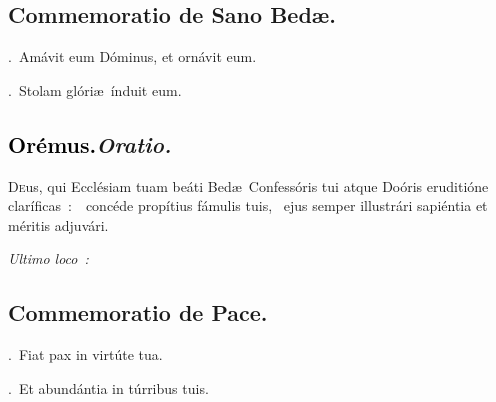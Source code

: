 \documentclass[12pt]{article} %
\newenvironment{rubric}{\vspace{2 mm}\color{benred8} \itshape \leftskip 0in \setlength{\parindent}{0.25in}}{\vspace{2 mm}}
\newenvironment{response}{\leftskip 0in \setlength{\parindent}{0in}}{\vspace{2 mm}}
\let\oldgresixstar\gresixstar
\renewcommand{\gresixstar}{\textcolor{benred8}{\oldgresixstar}}
\let\oldgredagger\gredagger
\renewcommand{\gredagger}{\textcolor{benred8}{\oldgredagger}}
\let\oldVbar\Vbar
\renewcommand{\Vbar}{\textcolor{benred8}{\oldVbar .}}
\let\oldRbar\Rbar
\renewcommand{\Rbar}{\textcolor{benred8}{\oldRbar .}}
\def\capitulumSpace{\hspace{20 mm}}
\begin{document}
\subsection*{Commemoratio de Sano Bed\ae .}

\gresetfirstlineaboveinitial{\small \textsc{ \textbf{\textcolor{benred8}{IV}}}}{\small \textsc{ \textbf{\textcolor{benred8}{IV}}}}


\begin{response}
\Vbar\ Am\'{a}vit eum D\'{o}minus, et orn\'{a}vit eum.

\Rbar\ Stolam gl\'{o}ri\ae\ \'{i}nduit eum.

\end{response}

\subsection*{\textcolor{black}{Or\'{e}mus.}\capitulumSpace \emph{Oratio.}}

\begin{response}\lettrine{D}{e}us, qui Eccl\'{e}siam tuam be\'{a}ti Bed\ae\ Confess\'{o}ris tui atque Do\'{o}ris eruditi\'{o}ne clar\'{i}ficas~:~\gredagger\ conc\'{e}de prop\'{i}tius f\'{a}mulis tuis, \gresixstar\ ejus semper illustr\'{a}ri sapi\'{e}ntia et m\'{e}ritis adjuv\'{a}ri.

\end{response}

\begin{rubric}
Ultimo loco~:

\end{rubric}



\subsection*{Commemoratio de Pace.}


\gresetfirstlineaboveinitial{\small \textsc{ \textbf{\textcolor{benred8}{II}}}}{\small \textsc{ \textbf{\textcolor{benred8}{II}}}}

\begin{response}
\Vbar\ Fiat pax in virt\'{u}te tua.

\Rbar\ Et abund\'{a}ntia in t\'{u}rribus tuis.

\end{response}
\end{document}
